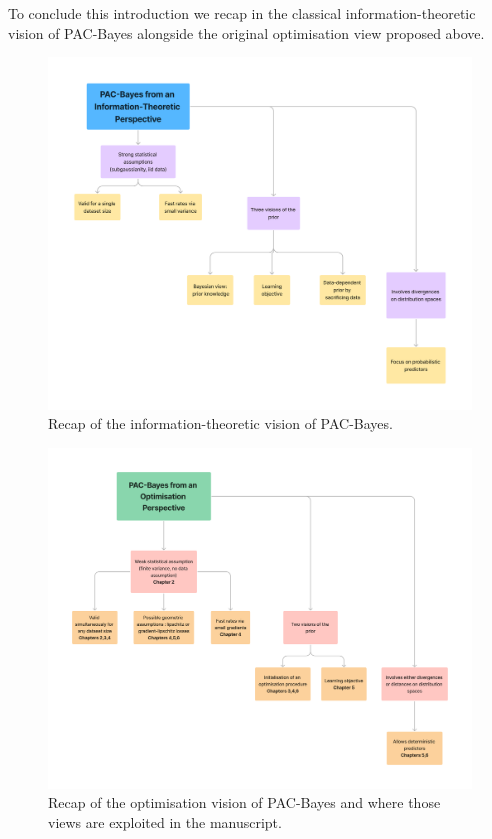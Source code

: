 To conclude this introduction we recap in  the classical information-theoretic vision of PAC-Bayes alongside the original optimisation view proposed above. 

\begin{figure}[ht]
  \centering
  \includegraphics[width=1.0\linewidth]{chapter_1/recap-info.pdf}
  \caption{Recap of the information-theoretic vision of PAC-Bayes.}
  \label{fig: recap-info}
\end{figure}
 
\begin{figure}[ht]
  \centering
  \includegraphics[width=1.0\linewidth]{chapter_1/recap-optim.pdf}
  \caption{Recap of the optimisation vision of PAC-Bayes and  where those views are exploited in the manuscript.}
  \label{fig: recap-optim}
\end{figure}


